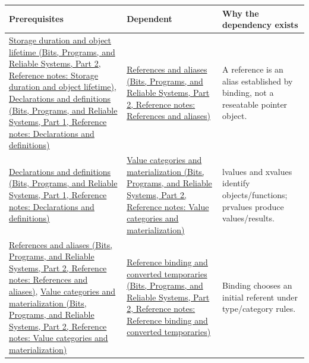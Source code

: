{\def\LTcaptype{none} %
\begin{longtable}[]{@{}
  >{\raggedright\arraybackslash}p{}
  >{\raggedright\arraybackslash}p{}
  >{\raggedright\arraybackslash}p{}@{}}
\toprule\noalign{}
\begin{minipage}[b]{\linewidth}\raggedright
Prerequisites
\end{minipage} & \begin{minipage}[b]{\linewidth}\raggedright
Dependent
\end{minipage} & \begin{minipage}[b]{\linewidth}\raggedright
Why the dependency exists
\end{minipage} \\
\midrule\noalign{}
\endhead
\bottomrule\noalign{}
\endlastfoot
\href{../01-Bits-Programs-and-Reliable-Systems-P02/main.pdf\#appendix-0b104bcba06b}{Storage duration and object lifetime (Bits, Programs, and Reliable Systems, Part 2, Reference notes: Storage duration and object lifetime)}, \href{../01-Bits-Programs-and-Reliable-Systems-P01/main.pdf\#appendix-2e4d494c2d94}{Declarations and definitions (Bits, Programs, and Reliable Systems, Part 1, Reference notes: Declarations and definitions)} & \href{../01-Bits-Programs-and-Reliable-Systems-P02/main.pdf\#appendix-d6d562ca9fbb}{References and aliases (Bits, Programs, and Reliable Systems, Part 2, Reference notes: References and aliases)} & A reference is an alias established by binding, not a reseatable pointer object. \\
\href{../01-Bits-Programs-and-Reliable-Systems-P01/main.pdf\#appendix-2e4d494c2d94}{Declarations and definitions (Bits, Programs, and Reliable Systems, Part 1, Reference notes: Declarations and definitions)} & \href{../01-Bits-Programs-and-Reliable-Systems-P02/main.pdf\#appendix-1121b30eaeb0}{Value categories and materialization (Bits, Programs, and Reliable Systems, Part 2, Reference notes: Value categories and materialization)} & lvalues and xvalues identify objects/functions; prvalues produce values/results. \\
\href{../01-Bits-Programs-and-Reliable-Systems-P02/main.pdf\#appendix-d6d562ca9fbb}{References and aliases (Bits, Programs, and Reliable Systems, Part 2, Reference notes: References and aliases)}, \href{../01-Bits-Programs-and-Reliable-Systems-P02/main.pdf\#appendix-1121b30eaeb0}{Value categories and materialization (Bits, Programs, and Reliable Systems, Part 2, Reference notes: Value categories and materialization)} & \href{../01-Bits-Programs-and-Reliable-Systems-P02/main.pdf\#appendix-37856d997bb0}{Reference binding and converted temporaries (Bits, Programs, and Reliable Systems, Part 2, Reference notes: Reference binding and converted temporaries)} & Binding chooses an initial referent under type/category rules. \\

\end{longtable}}
